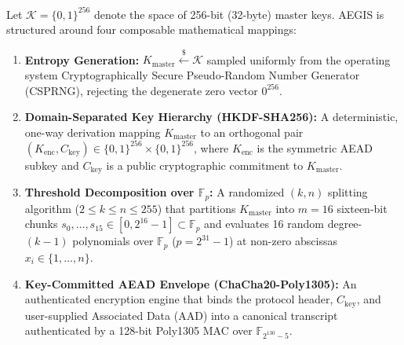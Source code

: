 \documentclass[11pt,a4paper]{article}
\theoremstyle{definition}
\newcommand{\Fp}{\mathbb{F}_p}
\begin{document}
Let $\mathcal{K} = \{0,1\}^{256}$ denote the space of 256-bit (32-byte) master keys. AEGIS is structured around four composable mathematical mappings:
\begin{enumerate}[label=(\arabic*)]
    \item \textbf{Entropy Generation:} $K_{\mathrm{master}} \xleftarrow{\$} \mathcal{K}$ sampled uniformly from the operating system Cryptographically Secure Pseudo-Random Number Generator (CSPRNG), rejecting the degenerate zero vector $0^{256}$.
    \item \textbf{Domain-Separated Key Hierarchy (HKDF-SHA256):} A deterministic, one-way derivation mapping $K_{\mathrm{master}}$ to an orthogonal pair $(K_{\mathrm{enc}}, C_{\mathrm{key}}) \in \{0,1\}^{256} \times \{0,1\}^{256}$, where $K_{\mathrm{enc}}$ is the symmetric AEAD subkey and $C_{\mathrm{key}}$ is a public cryptographic commitment to $K_{\mathrm{master}}$.
    \item \textbf{Threshold Decomposition over $\Fp$:} A randomized $(k,n)$ splitting algorithm ($2 \le k \le n \le 255$) that partitions $K_{\mathrm{master}}$ into $m = 16$ sixteen-bit chunks $s_0, \dots, s_{15} \in [0, 2^{16}-1] \subset \Fp$ and evaluates 16 random degree-$(k-1)$ polynomials over $\Fp$ ($p = 2^{31}-1$) at non-zero abscissas $x_i \in \{1, \dots, n\}$.
    \item \textbf{Key-Committed AEAD Envelope (ChaCha20-Poly1305):} An authenticated encryption engine that binds the protocol header, $C_{\mathrm{key}}$, and user-supplied Associated Data ($\mathrm{AAD}$) into a canonical transcript authenticated by a 128-bit Poly1305 MAC over $\mathbb{F}_{2^{130}-5}$.
\end{enumerate}
\end{document}
